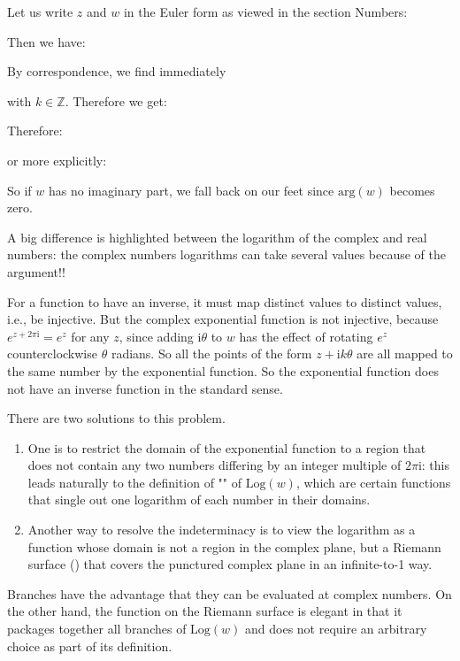 	Let us write $z$ and $w$ in the Euler form as viewed in the section Numbers:
	
	Then we have:
	
	By correspondence, we find immediately
	
	with $k \in \mathbb{Z}$. Therefore we get:
	
	Therefore:
	
	or more explicitly:
	
	So if $w$ has no imaginary part, we fall back on our feet since $\text{arg} (w)$ becomes zero.
	
	A big difference is highlighted between the logarithm of the complex and real numbers: the complex numbers logarithms can take several values because of the argument!!
	
	For a function to have an inverse, it must map distinct values to distinct values, i.e., be injective. But the complex exponential function is not injective, because $e^{z+2\pi \mathrm{i} }= e^z$ for any $z$, since adding $\mathrm{i}\theta$ to $w$ has the effect of rotating $e^z$ counterclockwise $\theta$ radians. So all the points of the form $z+\mathrm{i}k\theta$  are all mapped to the same number by the exponential function. So the exponential function does not have an inverse function in the standard sense.
	
	There are two solutions to this problem.
	
	\begin{enumerate}
		\item One is to restrict the domain of the exponential function to a region that does not contain any two numbers differing by an integer multiple of $2\pi \mathrm{i}$: this leads naturally to the definition of "" of $\text{Log}(w)$, which are certain functions that single out one logarithm of each number in their domains.
		
		\item Another way to resolve the indeterminacy is to view the logarithm as a function whose domain is not a region in the complex plane, but a Riemann surface () that covers the punctured complex plane in an infinite-to-1 way.
	\end{enumerate}
	Branches have the advantage that they can be evaluated at complex numbers. On the other hand, the function on the Riemann surface is elegant in that it packages together all branches of $\text{Log}(w)$ and does not require an arbitrary choice as part of its definition.
	

